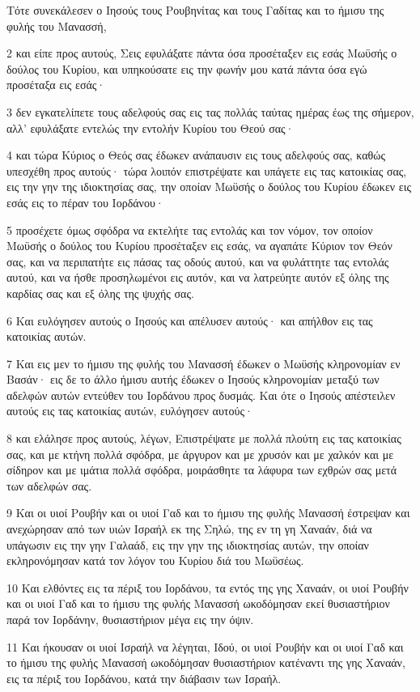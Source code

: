 \par Τότε συνεκάλεσεν ο Ιησούς τους Ρουβηνίτας και τους Γαδίτας και το ήμισυ της φυλής του Μανασσή,
\par 2 και είπε προς αυτούς, Σεις εφυλάξατε πάντα όσα προσέταξεν εις εσάς Μωϋσής ο δούλος του Κυρίου, και υπηκούσατε εις την φωνήν μου κατά πάντα όσα εγώ προσέταξα εις εσάς·
\par 3 δεν εγκατελίπετε τους αδελφούς σας εις τας πολλάς ταύτας ημέρας έως της σήμερον, αλλ' εφυλάξατε εντελώς την εντολήν Κυρίου του Θεού σας·
\par 4 και τώρα Κύριος ο Θεός σας έδωκεν ανάπαυσιν εις τους αδελφούς σας, καθώς υπεσχέθη προς αυτούς· τώρα λοιπόν επιστρέψατε και υπάγετε εις τας κατοικίας σας, εις την γην της ιδιοκτησίας σας, την οποίαν Μωϋσής ο δούλος του Κυρίου έδωκεν εις εσάς εις το πέραν του Ιορδάνου·
\par 5 προσέχετε όμως σφόδρα να εκτελήτε τας εντολάς και τον νόμον, τον οποίον Μωϋσής ο δούλος του Κυρίου προσέταξεν εις εσάς, να αγαπάτε Κύριον τον Θεόν σας, και να περιπατήτε εις πάσας τας οδούς αυτού, και να φυλάττητε τας εντολάς αυτού, και να ήσθε προσηλωμένοι εις αυτόν, και να λατρεύητε αυτόν εξ όλης της καρδίας σας και εξ όλης της ψυχής σας.
\par 6 Και ευλόγησεν αυτούς ο Ιησούς και απέλυσεν αυτούς· και απήλθον εις τας κατοικίας αυτών.
\par 7 Και εις μεν το ήμισυ της φυλής του Μανασσή έδωκεν ο Μωϋσής κληρονομίαν εν Βασάν· εις δε το άλλο ήμισυ αυτής έδωκεν ο Ιησούς κληρονομίαν μεταξύ των αδελφών αυτών εντεύθεν του Ιορδάνου προς δυσμάς. Και ότε ο Ιησούς απέστειλεν αυτούς εις τας κατοικίας αυτών, ευλόγησεν αυτούς·
\par 8 και ελάλησε προς αυτούς, λέγων, Επιστρέψατε με πολλά πλούτη εις τας κατοικίας σας, και με κτήνη πολλά σφόδρα, με άργυρον και με χρυσόν και με χαλκόν και με σίδηρον και με ιμάτια πολλά σφόδρα, μοιράσθητε τα λάφυρα των εχθρών σας μετά των αδελφών σας.
\par 9 Και οι υιοί Ρουβήν και οι υιοί Γαδ και το ήμισυ της φυλής Μανασσή έστρεψαν και ανεχώρησαν από των υιών Ισραήλ εκ της Σηλώ, της εν τη γη Χαναάν, διά να υπάγωσιν εις την γην Γαλαάδ, εις την γην της ιδιοκτησίας αυτών, την οποίαν εκληρονόμησαν κατά τον λόγον του Κυρίου διά του Μωϋσέως.
\par 10 Και ελθόντες εις τα πέριξ του Ιορδάνου, τα εντός της γης Χαναάν, οι υιοί Ρουβήν και οι υιοί Γαδ και το ήμισυ της φυλής Μανασσή ωκοδόμησαν εκεί θυσιαστήριον παρά τον Ιορδάνην, θυσιαστήριον μέγα εις την όψιν.
\par 11 Και ήκουσαν οι υιοί Ισραήλ να λέγηται, Ιδού, οι υιοί Ρουβήν και οι υιοί Γαδ και το ήμισυ της φυλής Μανασσή ωκοδόμησαν θυσιαστήριον κατέναντι της γης Χαναάν, εις τα πέριξ του Ιορδάνου, κατά την διάβασιν των Ισραήλ.
